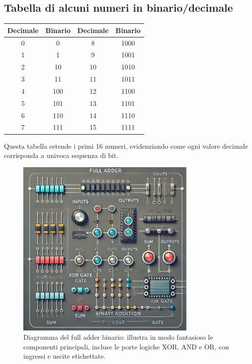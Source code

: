 \documentclass[a4paper,12pt]{report}
\begin{document}
\subsection*{Tabella di alcuni numeri in binario/decimale}
\begin{center}
\renewcommand{\arraystretch}{1.2}
\begin{tabular}{c|c||c|c}
\toprule
\textbf{Decimale} & \textbf{Binario} & \textbf{Decimale} & \textbf{Binario}\\
\midrule
0 & 0 & 8  & 1000 \\
1 & 1 & 9  & 1001 \\
2 & 10 & 10 & 1010 \\
3 & 11 & 11 & 1011 \\
4 & 100 & 12 & 1100 \\
5 & 101 & 13 & 1101 \\
6 & 110 & 14 & 1110 \\
7 & 111 & 15 & 1111 \\
\bottomrule
\end{tabular}
\end{center}
Questa tabella estende i primi 16 numeri, evidenziando come ogni valore decimale corrisponda a univoca sequenza di bit.

\begin{figure}[H]
    \centering
    \includegraphics[width=0.8\textwidth]{fulladder.png}
    \caption{Diagramma del full adder binario: illustra in modo fantasioso le componenti principali, incluse le porte logiche XOR, AND e OR, con ingressi e uscite etichettate.}
    \label{fig:full_adder}
\end{figure}
\end{document}
